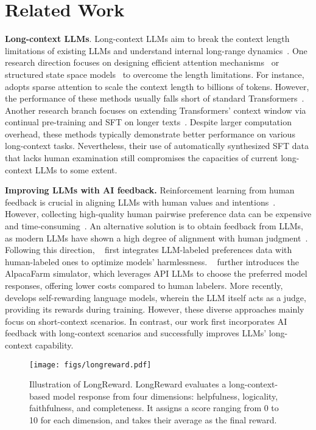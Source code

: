 \section{Related Work}
\textbf{Long-context LLMs}. 
Long-context LLMs aim to break the context length limitations of existing LLMs and understand internal long-range dynamics~\cite{longalign,ma2024megalodon}. One research direction focuses on designing efficient attention mechanisms~\cite{longformer, bigbird, minference} or structured state space models~\cite{poli2023hyena,gu2023mamba} to overcome the length limitations. For instance, ~\citet{ding2023longnet} adopts sparse attention to scale the context length to billions of tokens. However, the performance of these methods usually falls short of standard Transformers~\cite{gu2023mamba,ma2024megalodon}.
Another research branch focuses on extending Transformers' context window via continual pre-training and SFT on longer texts~\cite{longllama,longalign}. Despite larger computation overhead, these methods typically demonstrate better performance on various long-context tasks. Nevertheless, their use of automatically synthesized SFT data that lacks human examination still compromises the capacities of current long-context LLMs to some extent. 

\noindent\textbf{Improving LLMs with AI feedback.} 
Reinforcement learning from human feedback is crucial in aligning LLMs with human values and intentions~\cite{rlhf, bai2022training,sun2023salmon}. However, collecting high-quality human pairwise preference data can be expensive and time-consuming~\cite{constitutionalAI, rlaif}. 
An alternative solution is to obtain feedback from LLMs, as modern LLMs have shown a high degree of alignment with human judgment~\cite{ding2022gpt,gilardi2023chatgpt}. Following this direction, ~\citet{constitutionalAI} first integrates LLM-labeled preferences data with human-labeled ones to optimize models' harmlessness.
~\citet{dubois2024alpacafarm} further introduces the AlpacaFarm simulator, which leverages API LLMs to choose the preferred model responses, offering lower costs compared to human labelers. 
More recently, ~\citet{yuan2024self} develops self-rewarding language models, wherein the LLM itself acts as a judge, providing its rewards during training. However, these diverse approaches mainly focus on short-context scenarios. In contrast, our work first incorporates AI feedback with long-context scenarios and successfully improves LLMs' long-context capability.
\begin{figure*}
    \centering
    \texttt{[image: figs/longreward.pdf]}
    \caption{Illustration of LongReward. LongReward evaluates a long-context-based model response from four dimensions: helpfulness, logicality, faithfulness, and completeness. It assigns a score ranging from 0 to 10 for each dimension, and takes their average as the final reward.}
    \label{fig:longreward}
\end{figure*}

